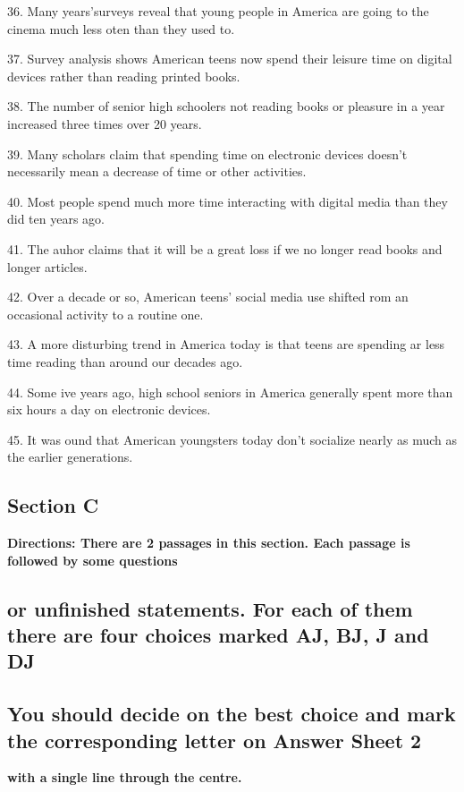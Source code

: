 \documentclass[UTF8,11pt]{ctexart}
\begin{document}
36. Many years'surveys reveal that young people in America are going to the cinema much less oten than they used to.


37. Survey analysis shows American teens now spend their leisure time on digital devices rather than reading printed books.


38. The number of senior high schoolers not reading books or pleasure in a year increased three times over 20 years.


39. Many scholars claim that spending time on electronic devices doesn't necessarily mean a decrease of time or other activities.


40. Most people spend much more time interacting with digital media than they did ten years ago.


41. The auhor claims that it will be a great loss if we no longer read books and longer articles.


42. Over a decade or so, American teens' social media use shifted rom an occasional activity to a routine one.


43. A more disturbing trend in America today is that teens are spending ar less time reading than around our decades ago.


44. Some ive years ago, high school seniors in America generally spent more than six hours a day on electronic devices.


45. It was ound that American youngsters today don't socialize nearly as much as the earlier generations.


\subsection*{\textbf{Section C}}


\textbf{Directions: There are 2 passages in this section. Each passage is followed by some questions}


\subsection*{\textbf{or unfinished statements. For each of them there are four choices marked AJ, BJ, J and DJ}}


\subsection*{\textbf{You should decide on the best choice and mark the corresponding letter on Answer Sheet 2}}


\textbf{with a single line through the centre.}
\end{document}
